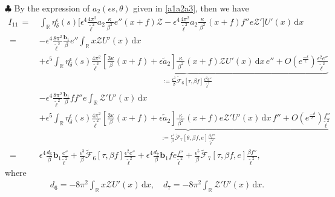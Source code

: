 \documentclass[10pt, reqno]{amsart}
\numberwithin{equation}{section}
\theoremstyle{definition}
\begin{document}
{\smallskip\noindent $\clubsuit$
By the expression of $a_2(\epsilon s, \theta) $ given in \eqref{a1a2a3}, then we have
\begin{align}\label{e-second order higher terms}
 I_{11}\,=\,& \int_{\mathbb R} \eta_\delta^\epsilon(s) \Bigg[ \epsilon^4 \frac{4\pi^2} {{\tilde\ell}^2} a_2\frac{\kappa}{\, \beta^2\, } e'' (x+f)\mathcal Z
 -\epsilon^4  \frac{ 4\pi^2} {{\tilde\ell}^2}  a_2\frac{\kappa}{\, \beta^2\, } (x+f) f'' e \mathcal Z' \Bigg]U'(x)\,{\mathrm d}x
\nonumber\\[2mm]
 \,=\,& -\epsilon^4 \frac{8\pi^2} {{\tilde\ell}^2} \frac{{\mathbf b}_1}{\, \beta\, } e''\int_{{\mathbb R}} x\mathcal Z U'(x) \,{\mathrm d}x
 \nonumber\\[2mm]
&+ \underbrace{ \epsilon^5 \int_{{\mathbb R}} \eta_\delta^\epsilon(s)\frac{4\pi^2} {{\tilde\ell}^2} \left[ \frac{3\kappa}{\beta}(x+f) + \epsilon {\tilde a}_2\right] \frac{\kappa}{\, \beta^2\, } (x+f)\mathcal Z U'(x) \,{\mathrm d}x\, e'' + O(e^{\frac{- \delta} \epsilon} ) \frac{\epsilon^2 e''}{\tilde\ell^2}}_{:= \frac{\epsilon^3}\beta \tilde{\mathcal F}_6\left[\tau, \beta f \right] \frac{\epsilon^2 e''}{\tilde\ell^2}}
\nonumber\\[2mm]
&-\epsilon^4 \frac{8\pi^2} {{\tilde\ell}^2} \frac{{\mathbf b}_1}{\, \beta\, } f f'' e\int_{{\mathbb R}} \mathcal Z' U'(x) \,{\mathrm d}x
 \nonumber\\[2mm]
&+ \underbrace{\epsilon^5 \int_{{\mathbb R}} \eta_\delta^\epsilon(s)\frac{4\pi^2} {{\tilde\ell}^2} \left[ \frac{3\kappa}{\beta}(x+f) + \epsilon {\tilde a}_2\right] \frac{\kappa}{\, \beta^2\, } (x+f) e\mathcal Z' U'(x) \,{\mathrm d}x\,  f''
 + O(e^{\frac{- \delta} \epsilon} ) \frac{f''}{\tilde\ell^2}}_{:= \frac{\epsilon^5}\beta \tilde{\mathcal F}_7\left[\theta, \beta f, e\right] \frac{\beta f''}{\tilde\ell^2}}
\nonumber\\[2mm]
 \,=\,&\epsilon^4 \frac{d_6} {\beta}{\mathbf b}_1 \frac{e''}{\tilde\ell^2} + \frac{\epsilon^3}\beta \tilde{\mathcal F}_6\left[\tau, \beta f \right] \frac{\epsilon^2 e''}{\tilde\ell^2}
 +\epsilon^4 \frac{d_7} {\beta}{\mathbf b}_1 f e\frac{f''}{\tilde\ell^2}+\frac{\epsilon^5}\beta \tilde{\mathcal F}_7\left[\tau, \beta f, e \right] \frac{\beta f''}{\tilde\ell^2},
\end{align}
where
\begin{align*}
d_6 = -8 \pi^2\int_{{\mathbb R}} x\mathcal Z U'(x) \,{\mathrm d}x,
\quad
d_7 = -8 \pi^2\int_{{\mathbb R}} \mathcal Z' U'(x) \,{\mathrm d}x.
\end{align*}

}
\end{document}
